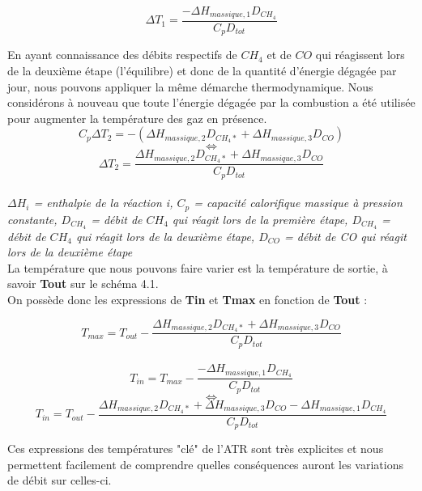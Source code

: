 \documentclass[12pt]{report}
\begin{document}
$$\Delta T_1 = \frac{-\Delta H_{massique,1} D_{CH_4}}{C_p D_{tot}}$$

En ayant connaissance des débits respectifs de $CH_4$ et de $CO$ qui réagissent lors de la deuxième étape (l'équilibre) et donc de la quantité d'énergie dégagée par jour, nous pouvons appliquer la même démarche thermodynamique. Nous considérons à nouveau que toute l'énergie dégagée par la combustion a été utilisée pour augmenter la température des gaz en présence. \\

$$ C_p \Delta T_2 = -(\Delta H_{massique,2} D_{CH_4*} + \Delta H_{massique,3}D_{CO})$$
$$\Leftrightarrow$$ 
$$ \Delta T_2 = \frac{\Delta H_{massique,2}D_{CH_4*}+\Delta H_{massique,3}D_{CO}}{C_p D_{tot}}$$\\

\textit{$\Delta H_{i}$ = enthalpie de la réaction i, $C_p$ = capacité calorifique massique à pression constante, $D_{CH_4}$ = débit de $CH_4$ qui réagit lors de la première étape, $D_{CH_4}$ = débit de $CH_4$ qui réagit lors de la deuxième étape, $D_{CO}$ = débit de CO qui réagit lors de la deuxième étape }\bigskip \\



La température que nous pouvons faire varier est la température de sortie, à savoir \textbf{Tout} sur le schéma 4.1.\\

On possède donc les expressions de \textbf{Tin} et \textbf{Tmax} en fonction de \textbf{Tout} : 

\begin{equation}
T_{max} = T_{out} - \frac{\Delta H_{massique,2}D_{CH_4*}+\Delta H_{massique,3}D_{CO}}{C_p D_{tot}}
\end{equation}\\

$$T_{in} = T_{max} - \frac{-\Delta H_{massique,1} D_{CH_4}}{C_p D_{tot}}$$
$$\Leftrightarrow$$
\begin{equation}
T_{in} = T_{out} - \frac{\Delta H_{massique,2}D_{CH_4*}+\Delta H_{massique,3}D_{CO} - \Delta H_{massique,1} D_{CH_4}}{C_p D_{tot}}
\end{equation}



Ces expressions des températures "clé" de l'ATR sont très explicites et nous permettent facilement de comprendre quelles conséquences auront les variations de débit sur celles-ci.\\
\end{document}
